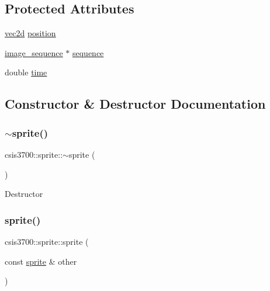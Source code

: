 \subsection*{Protected Attributes}
\begin{DoxyCompactItemize}
\item 
\hyperlink{classcsis3700_1_1vec2d}{vec2d} \hyperlink{classcsis3700_1_1sprite_aab9ac03c13c18eca432f5db06a8383b8}{position}
\item 
\hyperlink{classcsis3700_1_1image__sequence}{image\+\_\+sequence} $\ast$ \hyperlink{classcsis3700_1_1sprite_aa65b73f9bf7d266e57236f5b606b36e1}{sequence}
\item 
double \hyperlink{classcsis3700_1_1sprite_af12d2211006b3a184af6b70ed9e4235a}{time}
\end{DoxyCompactItemize}


\subsection{Constructor \& Destructor Documentation}
\mbox{\label{classcsis3700_1_1sprite_a8f6db48ecf33279af2d084a344baae8c}} 
\subsubsection{\texorpdfstring{$\sim$sprite()}{~sprite()}}
{\footnotesize\ttfamily csis3700\+::sprite\+::$\sim$sprite (\begin{DoxyParamCaption}{ }\end{DoxyParamCaption})\hspace{0.3cm}{\ttfamily [virtual]}}

Destructor \mbox{\label{classcsis3700_1_1sprite_adff79f206ea0703727a72287242fd8b1}} 
\subsubsection{\texorpdfstring{sprite()}{sprite()}}
{\footnotesize\ttfamily csis3700\+::sprite\+::sprite (\begin{DoxyParamCaption}\item[{const \hyperlink{classcsis3700_1_1sprite}{sprite} \&}]{other }\end{DoxyParamCaption})\hspace{0.3cm}{\ttfamily [inline]}}

